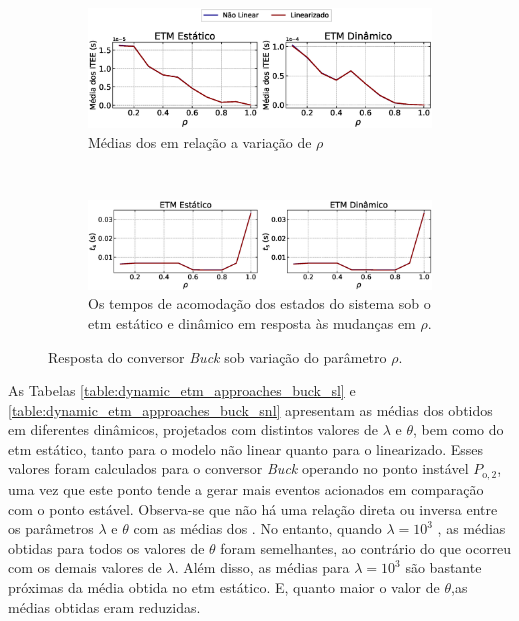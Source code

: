 \begin{figure}[H]
  \centering
  \captionsetup{justification=centering}
  \begin{subfigure}{1.\textwidth}
    \centering
    \includegraphics[width=1.\textwidth]{figuras/buck/itee-mean.eps}
    \caption{Médias dos  em relação a variação de $\rho$}
  \end{subfigure}
  \\[6pt]
  \begin{subfigure}{1.\textwidth} 
    \centering
    \includegraphics[width=1.\textwidth]{figuras/buck/ts.eps}
    \caption{Os tempos de acomodação dos estados do sistema sob o \acrshort{etm} estático e dinâmico em resposta às mudanças em $\rho$.}
  \end{subfigure}
  \caption{Resposta do conversor \textit{Buck} sob variação do parâmetro $\rho$.}
  \label{fig:buck_converter_rho}
\end{figure}

As Tabelas \ref{table:dynamic_etm_approaches_buck_sl} e \ref{table:dynamic_etm_approaches_buck_snl} apresentam as médias dos  obtidos em diferentes  dinâmicos, projetados com distintos valores de $\lambda$ e $\theta$, bem como do \acrshort{etm} estático, tanto para o modelo não linear quanto para o linearizado. Esses valores foram calculados para o conversor \textit{Buck} operando no ponto instável $P_{\mathrm{o}, 2}$, uma vez que este ponto tende a gerar mais eventos acionados em comparação com o ponto estável. Observa-se que não há uma relação direta ou inversa entre os parâmetros $\lambda$ e $\theta$ com as médias dos . No entanto, quando $\lambda = 10^3$ , as médias obtidas para todos os valores de $\theta$ foram semelhantes, ao contrário do que ocorreu com os demais valores de $\lambda$. Além disso, as médias para $\lambda = 10^3$ são bastante próximas da média obtida no \acrshort{etm} estático. E, quanto maior o valor de $\theta$,as médias obtidas eram reduzidas.

